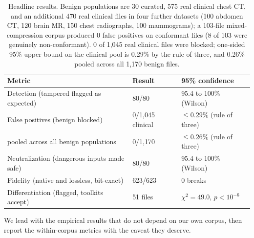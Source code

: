 \documentclass[11pt]{article}
\begin{document}
\begin{table}[ht]
\centering
\caption{Headline results. Benign populations are 30 curated, 575 real clinical chest CT, and an additional 470 real clinical files in four further datasets (100 abdomen CT, 120 brain MR, 150 chest radiographs, 100 mammograms); a 103-file mixed-compression corpus produced 0 false positives on conformant files (8 of 103 were genuinely non-conformant). 0 of 1,045 real clinical files were blocked; one-sided 95\% upper bound on the clinical pool is 0.29\% by the rule of three, and 0.26\% pooled across all 1,170 benign files.}
\label{tab:headline}
\begin{tabular}{@{}lll@{}}
\toprule
Metric & Result & 95\% confidence \\
\midrule
Detection (tampered flagged as expected) & 80/80 & 95.4 to 100\% (Wilson) \\
False positives (benign blocked) & 0/1,045 clinical & $\leq 0.29\%$ (rule of three) \\
\quad pooled across all benign populations & 0/1,170 & $\leq 0.26\%$ (rule of three) \\
Neutralization (dangerous inputs made safe) & 80/80 & 95.4 to 100\% (Wilson) \\
Fidelity (native and lossless, bit-exact) & 623/623 & 0 breaks \\
Differentiation (flagged, toolkits accept) & 51 files & $\chi^2 = 49.0$, $p < 10^{-6}$ \\
\bottomrule
\end{tabular}
\end{table}

We lead with the empirical results that do not depend on our own corpus, then report the within-corpus metrics with the caveat they deserve.
\end{document}
